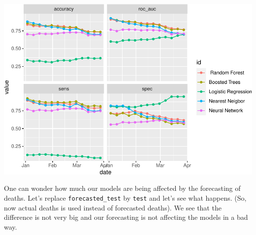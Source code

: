 \documentclass[
]{article}
\begin{document}
\includegraphics{figures/report/fig-unnamed-chunk-46-1.pdf}

One can wonder how much our models are being affected by the forecasting
of deaths. Let's replace \texttt{forecasted\_test} by \texttt{test} and
let's see what happens. (So, now actual deaths is used instead of
forecasted deaths). We see that the difference is not very big and our
forecasting is not affecting the models in a bad way.
\end{document}

